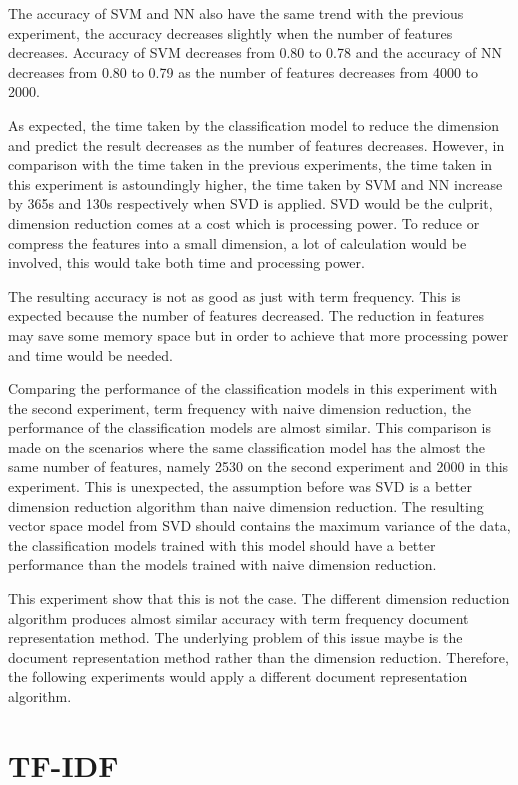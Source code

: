 The accuracy of SVM and NN also have the same trend with the previous experiment, the accuracy decreases slightly when the number of features decreases. Accuracy of SVM decreases from 0.80 to 0.78 and the accuracy of NN decreases from 0.80 to 0.79 as the number of features decreases from 4000 to 2000.

As expected, the time taken by the classification model to reduce the dimension and predict the result decreases as the number of features decreases. However, in comparison with the time taken in the previous experiments, the time taken in this experiment is astoundingly higher, the time taken by SVM and NN increase by 365s and 130s respectively when SVD is applied. SVD would be the culprit, dimension reduction comes at a cost which is processing power. To reduce or compress the features into a small dimension, a lot of calculation would be involved, this would take both time and processing power.

The resulting accuracy is not as good as just with term frequency. This is expected because the number of features decreased. The reduction in features may save some memory space but in order to achieve that more processing power and time would be needed.

Comparing the performance of the classification models in this experiment with the second experiment, term frequency with naive dimension reduction, the performance of the classification models are almost similar. This comparison is made on the scenarios where the same classification model has the almost the same number of features, namely 2530 on the second experiment and 2000 in this experiment. This is unexpected, the assumption before was SVD is a better dimension reduction algorithm than naive dimension reduction. The resulting vector space model from SVD should contains the maximum variance of the data, the classification models trained with this model should have a better performance than the models trained with naive dimension reduction.

This experiment show that this is not the case. The different dimension reduction algorithm produces almost similar accuracy with term frequency document representation method. The underlying problem of this issue maybe is the document representation method rather than the dimension reduction. Therefore, the following experiments would apply a different document representation algorithm.\\

\clearpage
\section{TF-IDF}

